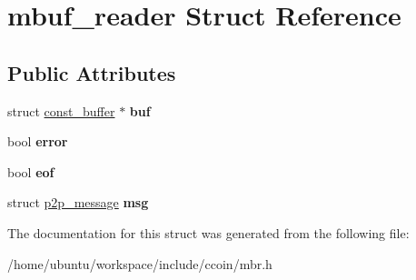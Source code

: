 \hypertarget{structmbuf__reader}{\section{mbuf\-\_\-reader Struct Reference}
\label{structmbuf__reader}
}
\subsection*{Public Attributes}
\begin{DoxyCompactItemize}
\item 
\hypertarget{structmbuf__reader_a139f95e928b06b97adf09509bd0f96c7}{struct \hyperlink{structconst__buffer}{const\-\_\-buffer} $\ast$ {\bfseries buf}}\label{structmbuf__reader_a139f95e928b06b97adf09509bd0f96c7}

\item 
\hypertarget{structmbuf__reader_a2056ca7e71519b0dcd8bf44f2e6eff69}{bool {\bfseries error}}\label{structmbuf__reader_a2056ca7e71519b0dcd8bf44f2e6eff69}

\item 
\hypertarget{structmbuf__reader_a47750845652313330ef2943b8cd2be68}{bool {\bfseries eof}}\label{structmbuf__reader_a47750845652313330ef2943b8cd2be68}

\item 
\hypertarget{structmbuf__reader_adf34f10dea9137b5ae4acdc556b99568}{struct \hyperlink{structp2p__message}{p2p\-\_\-message} {\bfseries msg}}\label{structmbuf__reader_adf34f10dea9137b5ae4acdc556b99568}

\end{DoxyCompactItemize}


The documentation for this struct was generated from the following file\-:\begin{DoxyCompactItemize}
\item 
/home/ubuntu/workspace/include/ccoin/mbr.\-h\end{DoxyCompactItemize}

